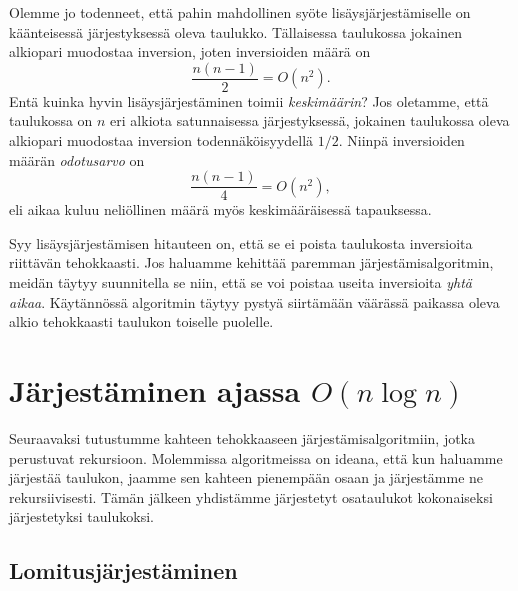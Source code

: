 Olemme jo todenneet, että pahin mahdollinen syöte
lisäysjärjestämiselle on käänteisessä järjestyksessä oleva taulukko.
Tällaisessa taulukossa jokainen alkiopari muodostaa inversion,
joten inversioiden määrä on
\[\frac{n(n-1)}{2}=O(n^2).\]
Entä kuinka hyvin lisäysjärjestäminen toimii \emph{keskimäärin}?
Jos oletamme, että taulukossa on $n$ eri alkiota satunnaisessa
järjestyksessä, jokainen taulukossa oleva alkiopari muodostaa
inversion todennäköisyydellä $1/2$.
Niinpä inversioiden määrän \emph{odotusarvo} on
\[\frac{n(n-1)}{4}=O(n^2),\]
eli aikaa kuluu neliöllinen määrä myös keskimääräisessä
tapauksessa.

Syy lisäysjärjestämisen hitauteen on,
että se ei poista taulukosta inversioita riittävän tehokkaasti.
Jos haluamme kehittää paremman järjestämis\-algoritmin,
meidän täytyy suunnitella se niin, että se voi poistaa
useita inversioita \emph{yhtä aikaa}.
Käytännössä algoritmin täytyy pystyä siirtämään
väärässä paikassa oleva alkio tehokkaasti taulukon
toiselle puolelle.

\section{Järjestäminen ajassa $O(n \log n)$}

Seuraavaksi tutustumme kahteen tehokkaaseen
järjestämisalgoritmiin, jotka perustuvat rekursioon.
Molemmissa algoritmeissa on ideana,
että kun haluamme järjestää taulukon,
jaamme sen kahteen pienempään osaan
ja järjestämme ne rekursiivisesti.
Tämän jälkeen yhdistämme järjestetyt osataulukot
kokonaiseksi järjestetyksi taulukoksi.

\subsection{Lomitusjärjestäminen}


